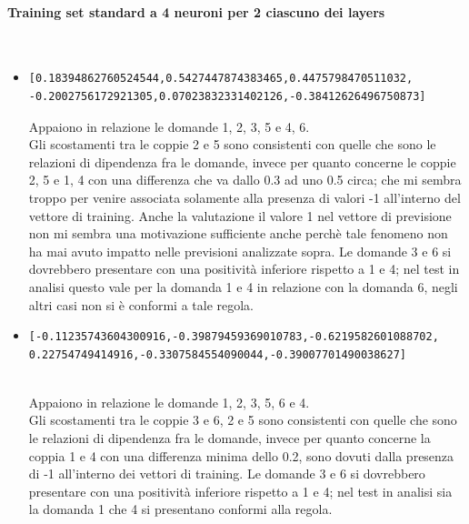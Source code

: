 \paragraph{Training set standard a 4 neuroni per 2 ciascuno dei layers}\mbox{}
\label{Training set standard a 4 neuroni per 2 ciascuno dei layers}
\\
\noindent
\begin{itemize}
\item \begin{verbatim}[0.18394862760524544,0.5427447874383465,0.4475798470511032,
-0.2002756172921305,0.07023832331402126,-0.38412626496750873] \end{verbatim}
Appaiono in relazione le domande 1, 2, 3, 5 e 4, 6.\\
Gli scostamenti tra le coppie 2 e 5 sono consistenti con quelle che sono le relazioni  di dipendenza fra le domande, invece per quanto concerne le coppie 2, 5 e 1, 4 con una differenza che va dallo 0.3 ad uno 0.5 circa; che mi sembra troppo per venire associata solamente alla presenza di valori -1 all'interno del vettore di training. Anche la valutazione il valore 1 nel vettore di previsione non mi sembra una motivazione sufficiente anche perch\`e tale fenomeno non ha mai avuto impatto nelle previsioni analizzate sopra.
Le domande 3 e 6 si dovrebbero presentare con una positivit\`a inferiore rispetto a 1 e 4; nel test in analisi questo vale per la domanda 1 e 4 in relazione con la domanda 6, negli altri casi non si \`e conformi a tale regola.

\item \begin{verbatim}[-0.11235743604300916,-0.39879459369010783,-0.6219582601088702,
0.22754749414916,-0.3307584554090044,-0.39007701490038627] \end{verbatim}\\
Appaiono in relazione le domande 1, 2, 3, 5, 6 e 4.\\
Gli scostamenti tra le coppie 3 e 6, 2 e 5 sono consistenti con quelle che sono le relazioni di dipendenza fra le domande, invece per quanto concerne la coppia 1 e 4 con una differenza minima dello 0.2, sono dovuti dalla presenza di -1  all'interno dei vettori di training.
Le domande 3 e 6 si dovrebbero presentare con una positivit\`a inferiore rispetto a 1 e 4; nel test in analisi sia la domanda 1 che 4 si presentano conformi alla regola.


\end{itemize}
